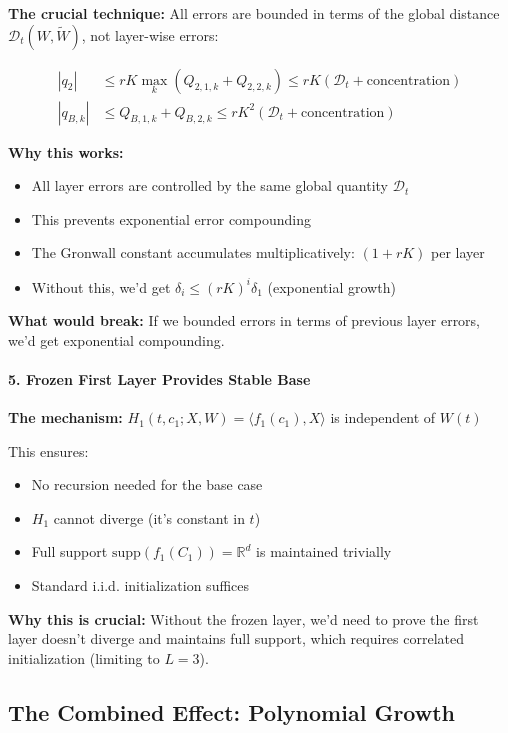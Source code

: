 \textbf{The crucial technique:} All errors are bounded in terms of the global distance $\mathscr{D}_t(W, \tilde{W})$, not layer-wise errors:

\begin{align*}
|q_2| &\le rK \max_k(Q_{2,1,k} + Q_{2,2,k}) \le rK(\mathscr{D}_t + \text{concentration})\\
|q_{B,k}| &\le Q_{B,1,k} + Q_{B,2,k} \le rK^2(\mathscr{D}_t + \text{concentration})
\end{align*}

\textbf{Why this works:}
\begin{itemize}
\item All layer errors are controlled by the same global quantity $\mathscr{D}_t$
\item This prevents exponential error compounding
\item The Gronwall constant accumulates multiplicatively: $(1+rK)$ per layer
\item Without this, we'd get $\delta_i \le (rK)^i \delta_1$ (exponential growth)
\end{itemize}

\textbf{What would break:} If we bounded errors in terms of previous layer errors, we'd get exponential compounding.

\paragraph*{5. Frozen First Layer Provides Stable Base}

\textbf{The mechanism:} $H_1(t, c_1; X, W) = \langle f_1(c_1), X\rangle$ is independent of $W(t)$

This ensures:
\begin{itemize}
\item No recursion needed for the base case
\item $H_1$ cannot diverge (it's constant in $t$)
\item Full support $\text{supp}(f_1(C_1)) = \mathbb{R}^d$ is maintained trivially
\item Standard i.i.d. initialization suffices
\end{itemize}

\textbf{Why this is crucial:} Without the frozen layer, we'd need to prove the first layer doesn't diverge and maintains full support, which requires correlated initialization (limiting to $L=3$).

\subsection{The Combined Effect: Polynomial Growth}


